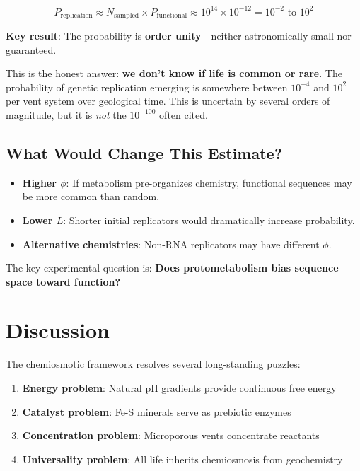 \documentclass[11pt,twocolumn]{article}
\begin{document}
\begin{equation}
P_{\text{replication}} \approx N_{\text{sampled}} \times P_{\text{functional}} \approx 10^{14} \times 10^{-12} = 10^{-2} \text{ to } 10^{2}
\end{equation}

\textbf{Key result}: The probability is \textbf{order unity}—neither astronomically small nor guaranteed.

This is the honest answer: \textbf{we don't know if life is common or rare}. The probability of genetic replication emerging is somewhere between $10^{-4}$ and $10^{2}$ per vent system over geological time. This is uncertain by several orders of magnitude, but it is \textit{not} the $10^{-100}$ often cited.

\subsection{What Would Change This Estimate?}

\begin{itemize}
\item \textbf{Higher $\phi$}: If metabolism pre-organizes chemistry, functional sequences may be more common than random.
\item \textbf{Lower $L$}: Shorter initial replicators would dramatically increase probability.
\item \textbf{Alternative chemistries}: Non-RNA replicators may have different $\phi$.
\end{itemize}

The key experimental question is: \textbf{Does protometabolism bias sequence space toward function?}

\section{Discussion}

The chemiosmotic framework resolves several long-standing puzzles:

\begin{enumerate}
\item \textbf{Energy problem}: Natural pH gradients provide continuous free energy
\item \textbf{Catalyst problem}: Fe-S minerals serve as prebiotic enzymes
\item \textbf{Concentration problem}: Microporous vents concentrate reactants
\item \textbf{Universality problem}: All life inherits chemiosmosis from geochemistry
\end{enumerate}
\end{document}
